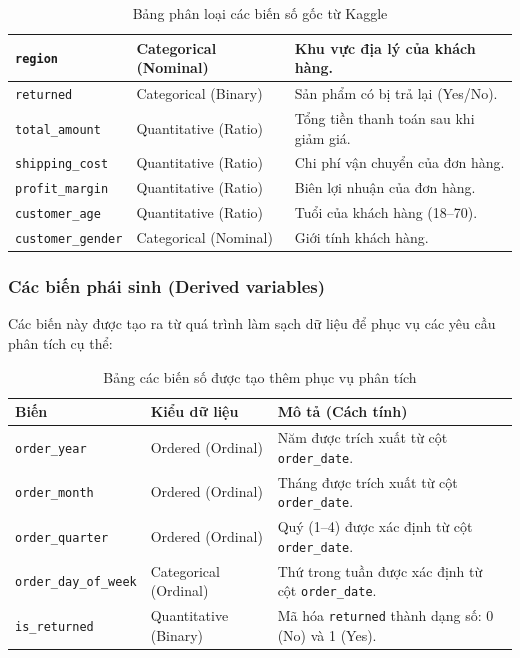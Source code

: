 \begin{table}[H]
\begin{tabularx}{\textwidth}{|l|L{3.5cm}|X|}
    \texttt{region} & Categorical (Nominal) & Khu vực địa lý của khách hàng. \\
    \hline
    \texttt{returned} & Categorical (Binary) & Sản phẩm có bị trả lại (Yes/No). \\
    \hline
    \texttt{total\_amount} & Quantitative (Ratio) & Tổng tiền thanh toán sau khi giảm giá. \\
    \hline
    \texttt{shipping\_cost} & Quantitative (Ratio) & Chi phí vận chuyển của đơn hàng. \\
    \hline
    \texttt{profit\_margin} & Quantitative (Ratio) & Biên lợi nhuận của đơn hàng. \\
    \hline
    \texttt{customer\_age} & Quantitative (Ratio) & Tuổi của khách hàng (18--70). \\
    \hline
    \texttt{customer\_gender} & Categorical (Nominal) & Giới tính khách hàng. \\
    \hline
\end{tabularx}
\caption{Bảng phân loại các biến số gốc từ Kaggle}
\end{table}
\newpage
\subsubsection{Các biến phái sinh (Derived variables)}

Các biến này được tạo ra từ quá trình làm sạch dữ liệu để phục vụ các yêu cầu phân tích cụ thể:

\begin{table}[H]
\centering
\small
\renewcommand{\arraystretch}{1.2}
\begin{tabularx}{\textwidth}{|l|L{3.5cm}|X|}
    \hline
    \textbf{Biến} & \textbf{Kiểu dữ liệu} & \textbf{Mô tả (Cách tính)} \\
    \hline
    \texttt{order\_year} & Ordered (Ordinal) & Năm được trích xuất từ cột \texttt{order\_date}. \\
    \hline
    \texttt{order\_month} & Ordered (Ordinal) & Tháng được trích xuất từ cột \texttt{order\_date}. \\
    \hline
    \texttt{order\_quarter} & Ordered (Ordinal) & Quý (1--4) được xác định từ cột \texttt{order\_date}. \\
    \hline
    \texttt{order\_day\_of\_week} & Categorical (Ordinal) & Thứ trong tuần được xác định từ cột \texttt{order\_date}. \\
    \hline
    \texttt{is\_returned} & Quantitative (Binary) & Mã hóa \texttt{returned} thành dạng số: 0 (No) và 1 (Yes). \\
    \hline
\end{tabularx}
\caption{Bảng các biến số được tạo thêm phục vụ phân tích}
\end{table}

